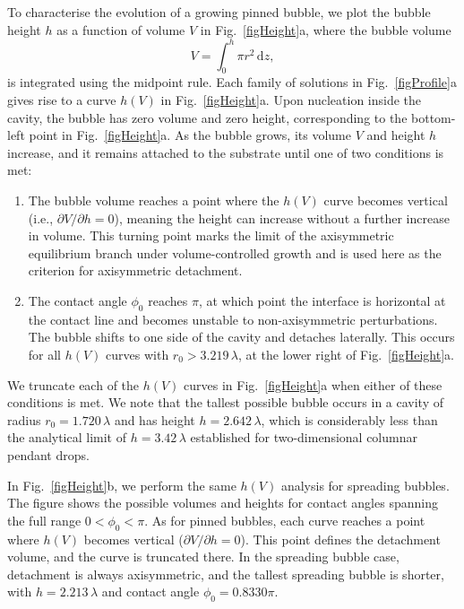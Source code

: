 \documentclass[9pt]{extarticle}
\begin{document}
To characterise the evolution of a growing pinned bubble, we plot the bubble height $h$ as a function of volume $V$ in Fig.~\ref{figHeight}a, where the bubble volume
\begin{equation}
V=\int_0^h\pi r^2\,\mathrm{d}z,
\end{equation}
is integrated using the midpoint rule. Each family of solutions in Fig.~\ref{figProfile}a gives rise to a curve $h(V)$ in Fig.~\ref{figHeight}a. Upon nucleation inside the cavity, the bubble has zero volume and zero height, corresponding to the bottom-left point in Fig.~\ref{figHeight}a. As the bubble grows, its volume $V$ and height $h$ increase, and it remains attached to the substrate until one of two conditions is met:
\begin{enumerate}
\item The bubble volume reaches a point where the $h(V)$ curve becomes vertical (i.e., $\partial V/\partial h = 0$), meaning the height can increase without a further increase in volume. This turning point marks the limit of the axisymmetric equilibrium branch under volume-controlled growth and is used here as the criterion for axisymmetric detachment.
\item The contact angle $\phi_0$ reaches $\pi$, at which point the interface is horizontal at the contact line and becomes unstable to non-axisymmetric perturbations\cite{michael76equilibrium}. The bubble shifts to one side of the cavity and detaches laterally. This occurs for all $h(V)$ curves with $r_0>3.219\,\lambda$, at the lower right of Fig.~\ref{figHeight}a.
\end{enumerate}
We truncate each of the $h(V)$ curves in Fig.~\ref{figHeight}a when either of these conditions is met. We note that the tallest possible bubble occurs in a cavity of radius $r_0=1.720\,\lambda$ and has height $h=2.642\,\lambda$, which is considerably less than the analytical limit of $h=3.42\,\lambda$ established for two-dimensional columnar pendant drops\cite{sumesh10possible}.

In Fig.~\ref{figHeight}b, we perform the same $h(V)$ analysis for spreading bubbles. The figure shows the possible volumes and heights for contact angles spanning the full range $0<\phi_0<\pi$. As for pinned bubbles, each curve reaches a point where $h(V)$ becomes vertical ($\partial V/\partial h=0$). This point defines the detachment volume, and the curve is truncated there. In the spreading bubble case, detachment is always axisymmetric, and the tallest spreading bubble is shorter, with $h=2.213\,\lambda$ and contact angle $\phi_0=0.8330\pi$.
\end{document}
